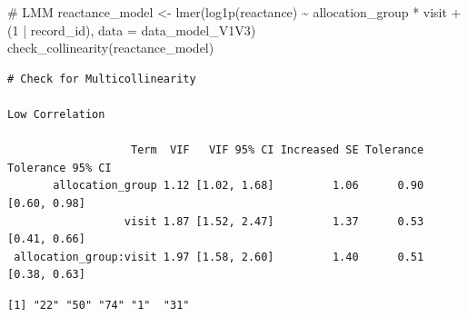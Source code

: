\documentclass[
  12pt,
]{article}
\newenvironment{Shaded}{\begin{snugshade}}{\end{snugshade}}
\newcommand{\AttributeTok}[1]{\textcolor[rgb]{0.40,0.45,0.13}{#1}}
\newcommand{\CommentTok}[1]{\textcolor[rgb]{0.37,0.37,0.37}{#1}}
\newcommand{\DecValTok}[1]{\textcolor[rgb]{0.68,0.00,0.00}{#1}}
\newcommand{\FunctionTok}[1]{\textcolor[rgb]{0.28,0.35,0.67}{#1}}
\newcommand{\NormalTok}[1]{\textcolor[rgb]{0.00,0.23,0.31}{#1}}
\newcommand{\OtherTok}[1]{\textcolor[rgb]{0.00,0.23,0.31}{#1}}
\newcommand{\SpecialCharTok}[1]{\textcolor[rgb]{0.37,0.37,0.37}{#1}}
\newcommand{\StringTok}[1]{\textcolor[rgb]{0.13,0.47,0.30}{#1}}
\begin{document}
\begin{Shaded}
\begin{Highlighting}[]
\CommentTok{\# LMM}
\NormalTok{reactance\_model }\OtherTok{\textless{}{-}} \FunctionTok{lmer}\NormalTok{(}\FunctionTok{log1p}\NormalTok{(reactance) }\SpecialCharTok{\textasciitilde{}}\NormalTok{ allocation\_group }\SpecialCharTok{*}\NormalTok{ visit }\SpecialCharTok{+} 
\NormalTok{(}\DecValTok{1} \SpecialCharTok{|}\NormalTok{ record\_id), }\AttributeTok{data =}\NormalTok{ data\_model\_V1V3)}
\FunctionTok{check\_collinearity}\NormalTok{(reactance\_model)}
\end{Highlighting}
\end{Shaded}

\begin{verbatim}
# Check for Multicollinearity

Low Correlation

                   Term  VIF   VIF 95% CI Increased SE Tolerance Tolerance 95% CI
       allocation_group 1.12 [1.02, 1.68]         1.06      0.90     [0.60, 0.98]
                  visit 1.87 [1.52, 2.47]         1.37      0.53     [0.41, 0.66]
 allocation_group:visit 1.97 [1.58, 2.60]         1.40      0.51     [0.38, 0.63]
\end{verbatim}

\begin{Shaded}
\end{Shaded}

\begin{verbatim}
[1] "22" "50" "74" "1"  "31"
\end{verbatim}
\end{document}
